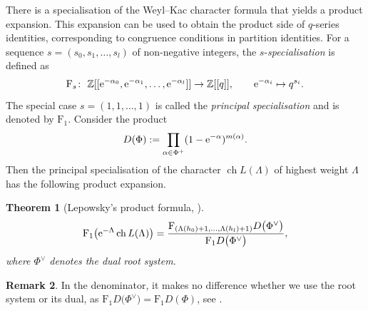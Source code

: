 \documentclass[pdftex]{sigma}
\numberwithin{equation}{section}
\newtheorem{Theorem}{Theorem}[section]
\theoremstyle{definition}
\newtheorem{Remark}[Theorem]{Remark}
\newcommand{\Z}{\mathbb{Z}}
\begin{document}
There is a specialisation of the Weyl--Kac character formula that yields a product expansion. This expansion can be used to obtain the product side of $q$-series identities, corresponding to congruence conditions in partition identities. For a sequence $s = (s_0,s_1,\ldots,s_l)$ of non-negative integers, the $s$-\emph{specialisation} is defined as
\[
\mathrm{F}_s\colon \ \Z[[{\rm e}^{-\alpha_0},{\rm e}^{-\alpha_1},\ldots,{\rm e}^{-\alpha_l}]]\to \Z[[q]],\qquad {\rm e}^{-\alpha_i}\mapsto q^{s_i}.
\]
The special case $s=(1,1,\ldots,1)$ is called the \emph{principal specialisation} and is denoted by $\mathrm{F}_1$. Consider the product
\[
D(\Phi):=\prod_{\alpha\in\Phi^+} (1-{\rm e}^{-\alpha} )^{m(\alpha)}.
\]
Then the principal specialisation of the character $\operatorname{ch}L(\Lambda)$ of highest weight $\Lambda$ has the following product expansion.

\begin{Theorem}[Lepowsky's product formula, \cite{Lep78}]%
\begin{align*}
 \mathrm{F}_1\bigl({\rm e}^{-\Lambda}\operatorname{ch}L(\Lambda)\bigr) = \frac{\mathrm{F}_{(\Lambda(h_0)+1,\ldots,\Lambda(h_l)+1)} D\bigl(\Phi^\vee\bigr)}{\mathrm{F}_1 D\bigl(\Phi^\vee\bigr)},
\end{align*}
where $\Phi^\vee$ denotes the dual root system.
\end{Theorem}
\begin{Remark}
In the denominator, it makes no difference whether we use the root system or its dual, as $\mathrm{F}_1 D\bigl(\Phi^\vee\bigr) = \mathrm{F}_1 D(\Phi)$, see \cite[equation~(10.8.5)]{Kac90}.
\end{Remark}
\end{document}
